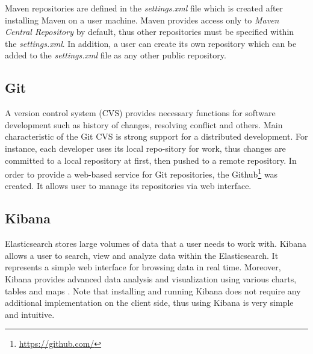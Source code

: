 \documentclass[12pt,oneside]{fithesis2}
\begin{document}
Maven repositories are defined in the \textit{settings.xml} file which is created after installing Maven on a user machine. Maven provides access only to \textit{Maven Central Repository} by default, thus other repositories must be specified within the \textit{settings.xml}. In addition, a user can create its own repository which can be added to the \textit{settings.xml} file as any other public repository.

\subsection{Git}
A version control system (CVS) provides necessary functions for software development such as history of changes, resolving conflict and others. Main characteristic of the Git CVS is strong support for a distributed development. For instance, each developer uses its local repo-sitory for work, thus changes are committed to a local repository at first, then pushed to a remote repository. In order to provide a web-based service for Git repositories, the Github\footnote{\url{https://github.com/}} was created. It allows user to manage its repositories via web interface.

\subsection{Kibana}
Elasticsearch stores large volumes of data that a user needs to work with. Kibana allows a user to search, view and analyze data within the Elasticsearch. It represents a simple web interface for browsing data in real time. Moreover, Kibana provides advanced data analysis and visualization using various charts, tables and maps \cite[Introduction]{kibana_doc}. Note that installing and running Kibana does not require any additional implementation on the client side, thus using Kibana is very simple and intuitive.
\end{document}

